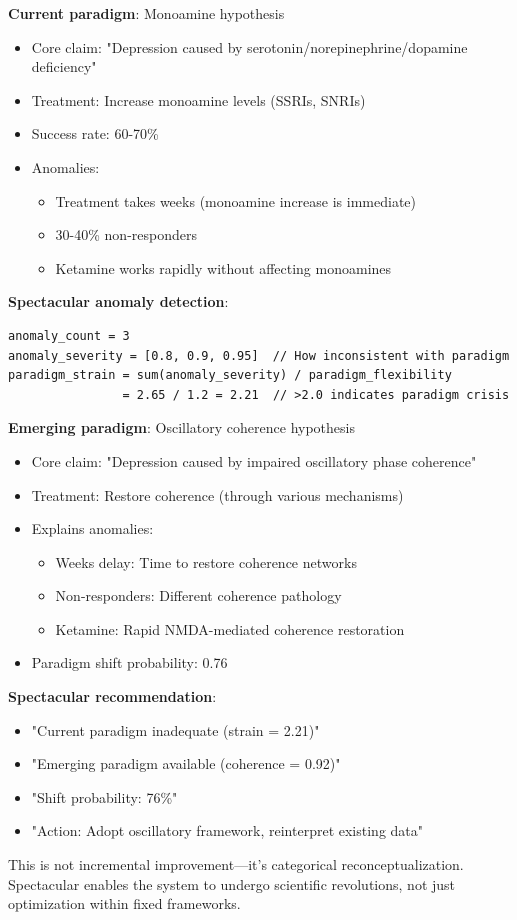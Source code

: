 \begin{example}
\textbf{Current paradigm}: Monoamine hypothesis
\begin{itemize}
\item Core claim: "Depression caused by serotonin/norepinephrine/dopamine deficiency"
\item Treatment: Increase monoamine levels (SSRIs, SNRIs)
\item Success rate: 60-70\%
\item Anomalies: 
    \begin{itemize}
    \item Treatment takes weeks (monoamine increase is immediate)
    \item 30-40\% non-responders
    \item Ketamine works rapidly without affecting monoamines
    \end{itemize}
\end{itemize}

\textbf{Spectacular anomaly detection}:
\begin{verbatim}
anomaly_count = 3
anomaly_severity = [0.8, 0.9, 0.95]  // How inconsistent with paradigm
paradigm_strain = sum(anomaly_severity) / paradigm_flexibility
                = 2.65 / 1.2 = 2.21  // >2.0 indicates paradigm crisis
\end{verbatim}

\textbf{Emerging paradigm}: Oscillatory coherence hypothesis
\begin{itemize}
\item Core claim: "Depression caused by impaired oscillatory phase coherence"
\item Treatment: Restore coherence (through various mechanisms)
\item Explains anomalies:
    \begin{itemize}
    \item Weeks delay: Time to restore coherence networks
    \item Non-responders: Different coherence pathology
    \item Ketamine: Rapid NMDA-mediated coherence restoration
    \end{itemize}
\item Paradigm shift probability: 0.76
\end{itemize}

\textbf{Spectacular recommendation}:
\begin{itemize}
\item "Current paradigm inadequate (strain = 2.21)"
\item "Emerging paradigm available (coherence = 0.92)"
\item "Shift probability: 76\%"
\item "Action: Adopt oscillatory framework, reinterpret existing data"
\end{itemize}

This is not incremental improvement—it's categorical reconceptualization. Spectacular enables the system to undergo scientific revolutions, not just optimization within fixed frameworks.
\end{example}


